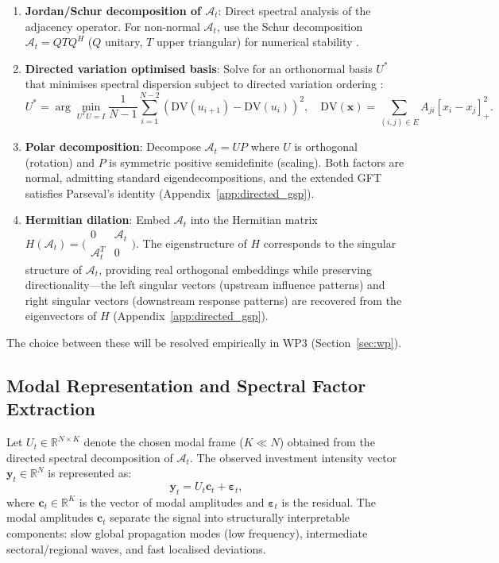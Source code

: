 \documentclass[11pt,a4paper]{article}
\theoremstyle{definition}
\newcommand{\R}{\mathbb{R}}
\newcommand{\bx}{\bm{x}}
\newcommand{\by}{\bm{y}}
\newcommand{\bc}{\bm{c}}
\begin{document}
\begin{enumerate}[nosep]
  \item \textbf{Jordan/Schur decomposition of $\mathcal{A}_t$}: Direct spectral analysis of the adjacency operator. For non-normal $\mathcal{A}_t$, use the Schur decomposition $\mathcal{A}_t = Q T Q^H$ ($Q$ unitary, $T$ upper triangular) for numerical stability \citep{sandryhaila2013discrete,sandryhaila2014discrete}.
  \item \textbf{Directed variation optimised basis}: Solve for an orthonormal basis $U^*$ that minimises spectral dispersion subject to directed variation ordering \citep{marques2020signal}:
  \begin{equation}
    U^* = \arg\min_{U^T U = I} \frac{1}{N-1}\sum_{i=1}^{N-2}\left(\mathrm{DV}(u_{i+1}) - \mathrm{DV}(u_i)\right)^2, \quad \mathrm{DV}(\bx) = \sum_{(i,j)\in E} A_{ji}[x_i - x_j]_+^2.
    \label{eq:directed_variation}
  \end{equation}
  \item \textbf{Polar decomposition}: Decompose $\mathcal{A}_t = UP$ where $U$ is orthogonal (rotation) and $P$ is symmetric positive semidefinite (scaling). Both factors are normal, admitting standard eigendecompositions, and the extended GFT satisfies Parseval's identity \citep{kwak2024polar} (Appendix~\ref{app:directed_gsp}).
  \item \textbf{Hermitian dilation}: Embed $\mathcal{A}_t$ into the Hermitian matrix $H(\mathcal{A}_t) = \bigl(\begin{smallmatrix} 0 & \mathcal{A}_t \\ \mathcal{A}_t^T & 0 \end{smallmatrix}\bigr)$. The eigenstructure of $H$ corresponds to the singular structure of $\mathcal{A}_t$, providing real orthogonal embeddings while preserving directionality---the left singular vectors (upstream influence patterns) and right singular vectors (downstream response patterns) are recovered from the eigenvectors of $H$ (Appendix~\ref{app:directed_gsp}).
\end{enumerate}

The choice between these will be resolved empirically in WP3 (Section~\ref{sec:wp}).

\subsection{Modal Representation and Spectral Factor Extraction}
\label{sec:spectral_factors}

Let $U_t \in \R^{N \times K}$ denote the chosen modal frame ($K \ll N$) obtained from the directed spectral decomposition of $\mathcal{A}_t$. The observed investment intensity vector $\by_t \in \R^N$ is represented as:
\begin{equation}
  \by_t = U_t \bc_t + \bm{\varepsilon}_t,
  \label{eq:modal_rep}
\end{equation}
where $\bc_t \in \R^K$ is the vector of modal amplitudes and $\bm{\varepsilon}_t$ is the residual. The modal amplitudes $\bc_t$ separate the signal into structurally interpretable components: slow global propagation modes (low frequency), intermediate sectoral/regional waves, and fast localised deviations.
\end{document}
